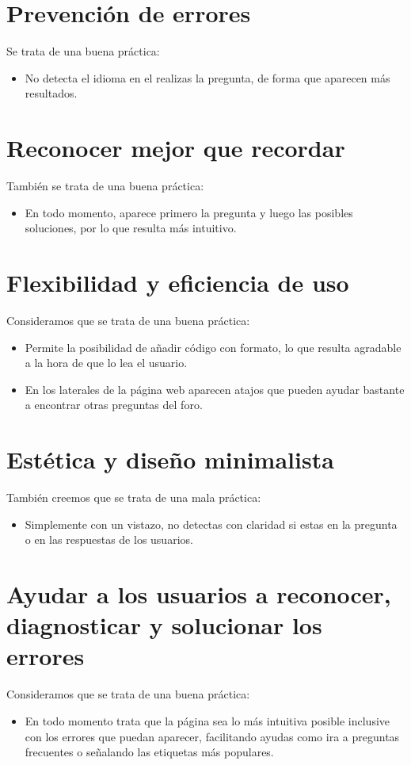 \documentclass[openany,overnay,a4paper, twoside, 14pt]{book}
\begin{document}
\section*{Prevención de errores}
Se trata de una buena práctica:
\begin{itemize}
\item No detecta el idioma en el realizas la pregunta, de forma que aparecen más resultados.
\end{itemize}
\section*{Reconocer mejor que recordar}
También se trata de una buena práctica:
\begin{itemize}
\item En todo momento, aparece primero la pregunta y luego las posibles soluciones, por lo que resulta más intuitivo.
\end{itemize}
\section*{Flexibilidad y eficiencia de uso}
Consideramos que se trata de una buena práctica:
\begin{itemize}
\item Permite la posibilidad de añadir código con formato, lo que resulta agradable a la hora de que lo lea el usuario.
   \item En los laterales de la página web aparecen atajos que pueden ayudar bastante a encontrar otras preguntas del foro.
\end{itemize}
\section*{Estética y diseño minimalista}
También creemos que se trata de una mala práctica:
\begin{itemize}
    \item Simplemente con un vistazo, no detectas con claridad si estas en la pregunta o en las respuestas de los usuarios.
\end{itemize}
\section*{Ayudar a los usuarios a reconocer, diagnosticar y solucionar los errores}
Consideramos que se trata de una buena práctica:
\begin{itemize}
    \item En todo momento trata que la página sea lo más intuitiva posible inclusive con los errores que puedan aparecer, facilitando ayudas como ira a preguntas frecuentes o señalando las etiquetas más populares.
\end{itemize}
\end{document}
